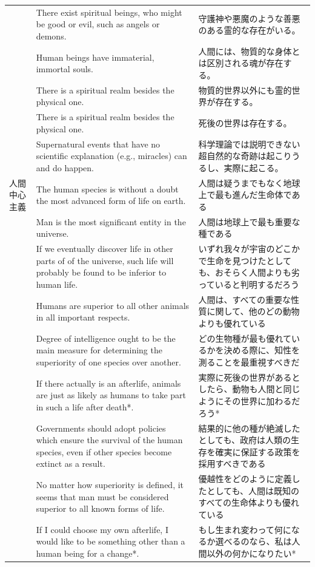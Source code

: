 \documentclass[a4j,12pt]{jreport}
\begin{document}
\begin{center}
{\begin{longtable}{lp{5cm}p{5cm}}
&There exist spiritual beings, who might be good or evil, such as angels or demons.&守護神や悪魔のような善悪のある霊的な存在がいる。\\
&Human beings have immaterial, immortal souls.&人間には、物質的な身体とは区別される魂が存在する。\\
&There is a spiritual realm besides the physical one.&物質的世界以外にも霊的世界が存在する。\\
&There is a spiritual realm besides the physical one.&死後の世界は存在する。\\
&Supernatural events that have no scientific explanation (e.g., miracles) can and do happen.&科学理論では説明できない超自然的な奇跡は起こりうるし、実際に起こる。\\
人間中心主義&The human species is without a doubt the most advanced form of life on earth.&人間は疑うまでもなく地球上で最も進んだ生命体である\\
&Man is the most significant entity in the universe.&人間は地球上で最も重要な種である\\
&If we eventually discover life in other parts of of the universe, such life will probably be found to be inferior to human life.&いずれ我々が宇宙のどこかで生命を見つけたとしても、おそらく人間よりも劣っていると判明するだろう\\
&Humans are superior to all other animals in all important respects.&人間は、すべての重要な性質に関して、他のどの動物よりも優れている\\
&Degree of intelligence ought to be the main measure for determining the superiority of one species over another.&どの生物種が最も優れているかを決める際に、知性を測ることを最重視すべきだ\\
&If there actually is an afterlife, animals are just as likely as humans to take part in such a life after death*.&実際に死後の世界があるとしたら、動物も人間と同じようにその世界に加わるだろう*\\
&Governments should adopt policies which ensure the survival of the human species, even if other species become extinct as a result.&結果的に他の種が絶滅したとしても、政府は人類の生存を確実に保証する政策を採用すべきである\\
&No matter how superiority is defined, it seems that man must be considered superior to all known forms of life.&優越性をどのように定義したとしても、人間は既知のすべての生命体よりも優れている\\
&If I could choose my own afterlife, I would like to be something other than a human being for a change*.&もし生まれ変わって何になるか選べるのなら、私は人間以外の何かになりたい*\\

\end{longtable}}
\end{center}
\end{document}
